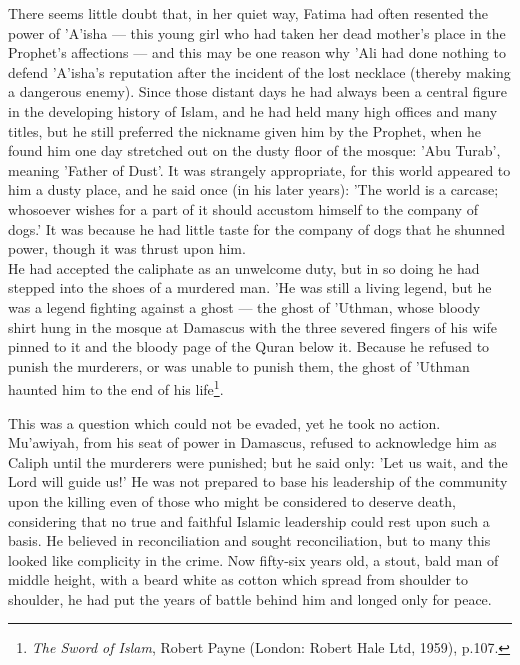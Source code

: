 \documentclass[11pt, b5paper, twoside]{book}
\begin{document}
There seems little doubt that, in her quiet way, Fatima had often resented the power of 'A'isha --- this young girl who had taken her dead mother's place in the Prophet's affections --- and this may be one reason why 'Ali had done nothing to defend 'A'isha's reputation after the incident of the lost necklace (thereby making a dangerous enemy). Since those distant days he had always been a central figure in the developing history of Islam, and he had held many high offices and many titles, but he still preferred the nickname given him by the Prophet, when he found him one day stretched out on the dusty floor of the mosque: 'Abu Turab', meaning 'Father of Dust'. It was strangely appropriate, for this world appeared to him a dusty place, and he said once (in his later years): 'The world is a carcase; whosoever wishes for a part of it should accustom himself to the company of dogs.' It was because he had little taste for the company of dogs that he shunned power, though it was thrust upon him. \\

He had accepted the caliphate as an unwelcome duty, but in so doing he had stepped into the shoes of a murdered man. 'He was still a living legend, but he was a legend fighting against a ghost --- the ghost of 'Uthman, whose bloody shirt hung in the mosque at Damascus with the three severed fingers of his wife pinned to it and the bloody page of the Quran below it. Because he refused to punish the murderers, or was unable to punish them, the ghost of 'Uthman haunted him to the end of his life\footnote{\emph{The Sword of Islam}, Robert Payne (London: Robert Hale Ltd, 1959), p.107.}.

This was a question which could not be evaded, yet he took no action. Mu'awiyah, from his seat of power in Damascus, refused to acknowledge him as Caliph until the murderers were punished; but he said only: 'Let us wait, and the Lord will guide us!' He was not prepared to base his leadership of the community upon the killing even of those who might be considered to deserve death, considering that no true and faithful Islamic leadership could rest upon such a basis. He believed in reconciliation and sought reconciliation, but to many this looked like complicity in the crime. Now fifty-six years old, a stout, bald man of middle height, with a beard white as cotton which spread from shoulder to shoulder, he had put the years of battle behind him and longed only for peace. \\
\end{document}
